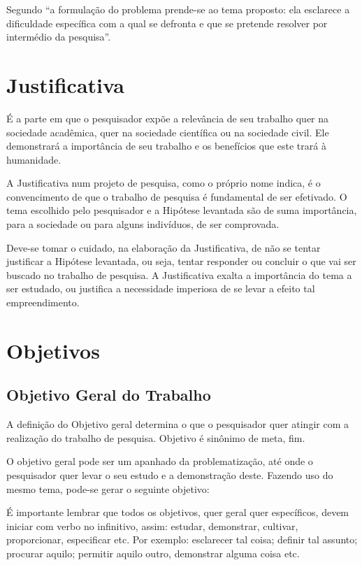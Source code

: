 \documentclass[12pt,article,a4paper,brazil,oldfontcommands,oneside]{abntex2}
\begin{document}
Segundo  ``a formulação do problema prende-se ao tema proposto: ela esclarece a dificuldade específica com a qual se defronta e que se pretende resolver por intermédio da pesquisa''. 

\section{Justificativa}

É a parte em que o pesquisador expõe a relevância de seu trabalho quer na sociedade acadêmica, quer na sociedade científica ou na sociedade civil. Ele demonstrará a importância de seu trabalho e os benefícios que este trará à humanidade.

A Justificativa num projeto de pesquisa, como o próprio nome indica, é o convencimento de que o trabalho de pesquisa é fundamental de ser efetivado. O tema escolhido pelo pesquisador e a Hipótese levantada são de suma importância, para a sociedade ou para alguns indivíduos, de ser comprovada.

Deve-se tomar o cuidado, na elaboração da Justificativa, de não se tentar justificar a Hipótese levantada, ou seja, tentar responder ou concluir o que vai ser buscado no trabalho de pesquisa. A Justificativa exalta a importância do tema a ser estudado, ou justifica a necessidade imperiosa de se levar a efeito tal empreendimento. 

\section{Objetivos}
\subsection{Objetivo Geral do Trabalho}

A definição do Objetivo geral determina o que o pesquisador quer atingir com a realização do trabalho de pesquisa. Objetivo é sinônimo de meta, fim.

O objetivo geral pode ser um apanhado da problematização, até onde o pesquisador quer levar o seu estudo e a demonstração deste. Fazendo uso do mesmo tema, pode-se gerar o seguinte objetivo:

É importante lembrar que todos os objetivos, quer geral quer específicos, devem iniciar com verbo no infinitivo, assim: estudar, demonstrar, cultivar, proporcionar, especificar etc. Por exemplo: esclarecer tal coisa; definir tal assunto; procurar aquilo; permitir aquilo outro, demonstrar alguma coisa etc.
\end{document}
